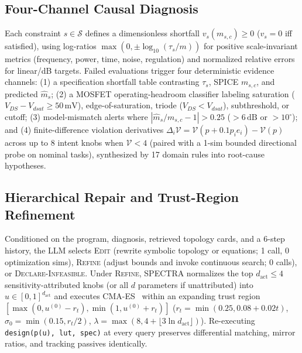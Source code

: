 \documentclass{article}
\theoremstyle{plain}
\begin{document}
\subsection{Four-Channel Causal Diagnosis}
Each constraint $s \in \mathcal{S}$ defines a dimensionless shortfall $v_s(m_{s,c}) \ge 0$ ($v_s = 0$ iff satisfied), using log-ratios $\max(0, \pm \log_{10}(\tau_s / m))$ for positive scale-invariant metrics (frequency, power, time, noise, regulation) and normalized relative errors for linear/dB targets. Failed evaluations trigger four deterministic evidence channels:
(1) a specification shortfall table contrasting $\tau_s$, SPICE $m_{s,c}$, and predicted $\hat{m}_s$;
(2) a MOSFET operating-headroom classifier labeling saturation ($V_{DS}-V_{dsat} \ge 50\,\mathrm{mV}$), edge-of-saturation, triode ($V_{DS} < V_{dsat}$), subthreshold, or cutoff;
(3) model-mismatch alerts where $|\hat{m}_s/m_{s,c} - 1| > 0.25$ ($>6\,\mathrm{dB}$ or $>10^\circ$); and
(4) finite-difference violation derivatives $\Delta_i \mathcal{V} = \mathcal{V}(p + 0.1 p_i e_i) - \mathcal{V}(p)$ across up to 8 intent knobs when $\mathcal{V} < 4$ (paired with a 1-sim bounded directional probe on nominal tasks), synthesized by 17 domain rules into root-cause hypotheses.

\subsection{Hierarchical Repair and Trust-Region Refinement}
Conditioned on the program, diagnosis, retrieved topology cards, and a 6-step history, the LLM selects \textsc{Edit} (rewrite symbolic topology or equations; 1 call, 0 optimization sims), \textsc{Refine} (adjust bounds and invoke continuous search; 0 calls), or \textsc{Declare-Infeasible}. Under \textsc{Refine}, \textsc{SPECTRA} normalizes the top $d_{\text{act}} \le 4$ sensitivity-attributed knobs (or all $d$ parameters if unattributed) into $u \in [0,1]^{d_{\text{act}}}$ and executes CMA-ES~\citep{hansen2016cma} within an expanding trust region $[\max(0, u^{(0)}-r_t), \min(1, u^{(0)}+r_t)]$ ($r_t = \min(0.25, 0.08 + 0.02t)$, $\sigma_0 = \min(0.15, r_t/2)$, $\lambda = \max(8, 4 + \lfloor 3\ln d_{\text{act}} \rfloor)$). Re-executing \texttt{design(p(u), lut, spec)} at every query preserves differential matching, mirror ratios, and tracking passives identically.
\end{document}
